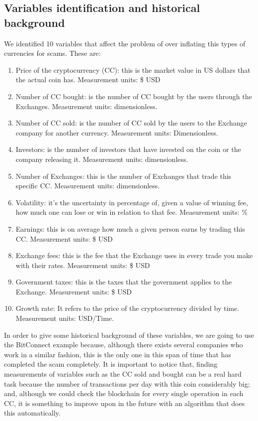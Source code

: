 \subsection{Variables identification and historical background}
We identified 10 variables that affect the problem of over inflating this types of currencies for scams. These are:
\begin{enumerate}
	\item Price of the cryptocurrency (CC): this is the market value in US dollars that the actual coin has. Measurement units: \$ USD
    \item Number of CC bought: is the number of CC bought by the users through the Exchanges. Measurement units: dimensionless.
    \item Number of CC sold: is the number of CC sold by the users to the Exchange company for another currency. Measurement units: Dimensionless.
    \item Investors: is the number of investors that have invested on the coin or the company releasing it. Measurement units: dimensionless.
    \item Number of Exchanges: this is the number of Exchanges that trade this specific CC. Measurement units: dimensionless.
   	\item Volatility: it's the uncertainty in percentage of, given a value of winning fee, how much one can lose or win in relation to that fee. Measurement units: \%
    \item Earnings: this is on average how much a given person earns by trading this CC. Measurement units: \$ USD
    \item Exchange fees: this is the fee that the Exchange uses in every trade you make with their rates. Measurement units: \$ USD
    \item Government taxes: this is the taxes that the government applies to the Exchange. Measurement units: \$ USD
    \item Growth rate: It refers to the price of the cryptocurrency divided by time\cite{GR}. Measurement units: USD/Time.
\end{enumerate}

\noindent In order to give some historical background of these variables, we are going to use the BitConnect example because, although there exists several companies who work in a similar fashion, this is the only one in this span of time that has completed the scam completely. It is important to notice that, finding measurements of variables such as the CC sold and bought can be a real hard task because the number of transactions per day with this coin considerably big; and, although we could check the blockchain for every single operation in each CC, it is something to improve upon in the future with an algorithm that does this automatically.

